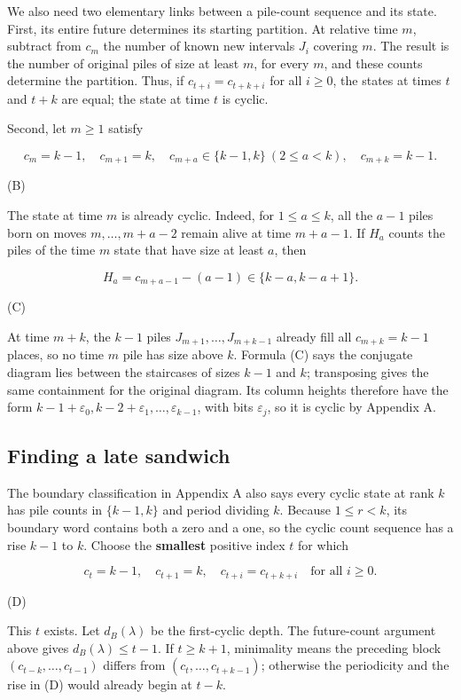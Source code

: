 \documentclass[11pt,a4paper]{article}
\begin{document}
We also need two elementary links between a pile-count sequence and its state. First, its entire future determines its starting partition. At relative time $m$, subtract from $c_m$ the number of known new intervals $J_i$ covering $m$. The result is the number of original piles of size at least $m$, for every $m$, and these counts determine the partition. Thus, if $c_{t+i}=c_{t+k+i}$ for all $i\ge0$, the states at times $t$ and $t+k$ are equal; the state at time $t$ is cyclic.

Second, let $m\ge1$ satisfy

\[
c_m=k-1,\quad c_{m+1}=k,\quad
c_{m+a}\in\{k-1,k\}\ (2\le a<k),\quad c_{m+k}=k-1.
\]

(B)

The state at time $m$ is already cyclic. Indeed, for $1\le a\le k$, all the $a-1$ piles born on moves $m,\ldots,m+a-2$ remain alive at time $m+a-1$. If $H_a$ counts the piles of the time $m$ state that have size at least $a$, then

\[
H_a=c_{m+a-1}-(a-1)\in\{k-a,k-a+1\}.
\]

(C)

At time $m+k$, the $k-1$ piles $J_{m+1},\ldots,J_{m+k-1}$ already fill all $c_{m+k}=k-1$ places, so no time $m$ pile has size above $k$. Formula (C) says the conjugate diagram lies between the staircases of sizes $k-1$ and $k$; transposing gives the same containment for the original diagram. Its column heights therefore have the form $k-1+\varepsilon_0,k-2+\varepsilon_1,\ldots,\varepsilon_{k-1}$, with bits $\varepsilon_j$, so it is cyclic by Appendix A.

\subsection{Finding a late sandwich}

The boundary classification in Appendix A also says every cyclic state at rank $k$ has pile counts in $\{k-1,k\}$ and period dividing $k$. Because $1\le r<k$, its boundary word contains both a zero and a one, so the cyclic count sequence has a rise $k-1$ to $k$. Choose the \textbf{smallest} positive index $t$ for which

\[
c_t=k-1,\quad c_{t+1}=k,\quad
c_{t+i}=c_{t+k+i}\quad\text{for all }i\ge0.
\]

(D)

This $t$ exists. Let $d_B(\lambda)$ be the first-cyclic depth. The future-count argument above gives $d_B(\lambda)\le t-1$. If $t\ge k+1$, minimality means the preceding block $(c_{t-k},\ldots,c_{t-1})$ differs from $(c_t,\ldots,c_{t+k-1})$; otherwise the periodicity and the rise in (D) would already begin at $t-k$.
\end{document}
